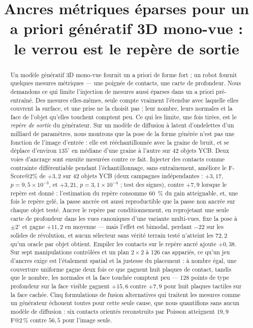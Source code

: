 \documentclass[conference]{IEEEtran}
\title{\LARGE\bf Ancres métriques éparses pour un a priori génératif 3D mono-vue :\\
le verrou est le repère de sortie}
\author{%
  \IEEEauthorblockN{Nom de l'auteur}
  \IEEEauthorblockA{Institut des Systèmes Intelligents et de Robotique (ISIR)\\
  Sorbonne Université, Paris, France\\
  \texttt{auteur@isir.upmc.fr}}%
}
\makeatletter
\newcommand{\Fs}{F@2\,\%}
\makeatother
\begin{document}
\maketitle

\begin{abstract}
Un modèle génératif 3D mono-vue fournit un a priori de forme fort ; un robot fournit
quelques mesures métriques --- une poignée de contacts, une carte de profondeur. Nous
demandons ce qui limite l'injection de mesures aussi éparses dans un a priori
pré-entraîné. Des mesures elles-mêmes, seule compte vraiment l'étendue avec laquelle
elles couvrent la surface, et une prise ne la choisit pas ; leur nombre, leurs normales
et la face de l'objet qu'elles touchent comptent peu. Ce qui les limite, une fois
tirées, est le \emph{repère de sortie} du générateur. Sur un
modèle de diffusion à latent d'ondelettes d'un milliard de paramètres, nous montrons
que la pose de la forme générée n'est pas une fonction de l'image d'entrée : elle est
rééchantillonnée avec la graine de bruit, et se déplace d'environ $135^\circ$ en médiane
d'une graine à l'autre sur 42 objets YCB. Deux voies d'ancrage sont ensuite mesurées
contre ce fait. Injecter des contacts comme contrainte différentiable pendant
l'échantillonnage, sans entraînement, améliore le F-Score@2\% de $+3{,}2$ sur 42
objets YCB (deux campagnes indépendantes : $+3{,}17$, $p = 9{,}5\times10^{-3}$, et
$+3{,}21$, $p = 3{,}1\times10^{-4}$ ; test des signes), contre $+7{,}9$ lorsque le
repère est donné : l'estimation du repère consomme 60~\% du gain atteignable, et, une fois le
repère gelé, la passe ancrée est aussi reproductible que la passe non ancrée sur
chaque objet testé. Ancrer le repère par conditionnement, en
reprojetant une seule carte de profondeur dans les vues canoniques d'une variante
multi-vues, fixe la pose à $\pm 2^\circ$ et gagne $+11{,}2$ en moyenne --- mais
l'effet est bimodal, perdant $-22$ sur les solides de révolution, et aucun sélecteur
sans vérité terrain testé n'atteint les $72{,}2$ qu'un oracle par objet obtient.
Empiler les contacts sur le repère ancré ajoute $+0{,}38$. Sur sept manipulations
contrôlées et un plan $2\times2$ à 126 cas appariés, ce qu'un jeu d'ancres exige est
l'étalement spatial et la justesse du placement : à nombre égal, une couverture
uniforme gagne deux fois ce que gagnent huit plaques de contact, tandis que le nombre,
les normales et la face touchée comptent peu --- 128 points de type profondeur sur la
face visible gagnent $+15{,}6$ contre $+7{,}9$ pour huit plaques tactiles sur la face
cachée. Cinq formulations de fusion alternatives qui traitent les mesures comme un
générateur échouent toutes pour cette seule cause, que nous quantifions sans aucun
modèle de diffusion : six contacts orientés reconstruits par Poisson atteignent
$19{,}9$ \Fs{} contre $56{,}5$ pour l'image seule.
\end{abstract}
\end{document}
